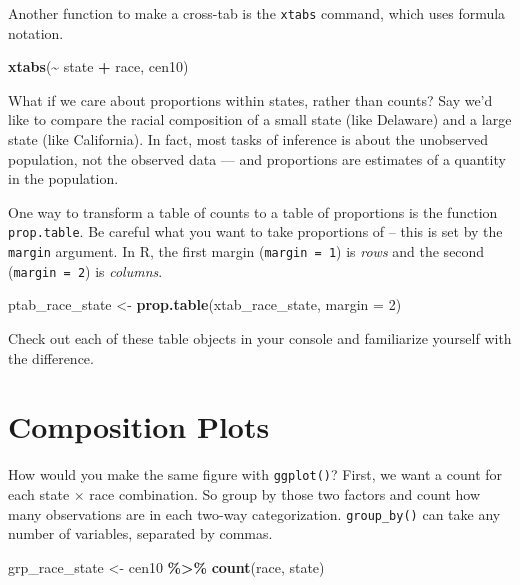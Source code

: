 \documentclass[
]{book}
\newenvironment{Shaded}{\begin{snugshade}}{\end{snugshade}}
\newcommand{\DataTypeTok}[1]{\textcolor[rgb]{0.13,0.29,0.53}{#1}}
\newcommand{\DecValTok}[1]{\textcolor[rgb]{0.00,0.00,0.81}{#1}}
\newcommand{\KeywordTok}[1]{\textcolor[rgb]{0.13,0.29,0.53}{\textbf{#1}}}
\newcommand{\NormalTok}[1]{#1}
\newcommand{\OperatorTok}[1]{\textcolor[rgb]{0.81,0.36,0.00}{\textbf{#1}}}
\newcommand{\StringTok}[1]{\textcolor[rgb]{0.31,0.60,0.02}{#1}}
\theoremstyle{definition}
\theoremstyle{definition}
\theoremstyle{definition}
\theoremstyle{remark}
\begin{document}
Another function to make a cross-tab is the \texttt{xtabs} command, which uses formula notation.

\begin{Shaded}
\begin{Highlighting}[]
\KeywordTok{xtabs}\NormalTok{(}\OperatorTok{\textasciitilde{}}\StringTok{ }\NormalTok{state }\OperatorTok{+}\StringTok{ }\NormalTok{race, cen10)}
\end{Highlighting}
\end{Shaded}

What if we care about proportions within states, rather than counts? Say we'd like to compare the racial composition of a small state (like Delaware) and a large state (like California). In fact, most tasks of inference is about the unobserved population, not the observed data --- and proportions are estimates of a quantity in the population.

One way to transform a table of counts to a table of proportions is the function \texttt{prop.table}. Be careful what you want to take proportions of -- this is set by the \texttt{margin} argument. In R, the first margin (\texttt{margin\ =\ 1}) is \emph{rows} and the second (\texttt{margin\ =\ 2}) is \emph{columns}.

\begin{Shaded}
\begin{Highlighting}[]
\NormalTok{ptab\_race\_state <{-}}\StringTok{ }\KeywordTok{prop.table}\NormalTok{(xtab\_race\_state, }\DataTypeTok{margin =} \DecValTok{2}\NormalTok{)}
\end{Highlighting}
\end{Shaded}

Check out each of these table objects in your console and familiarize yourself with the difference.

\hypertarget{composition-plots}{%
\section{Composition Plots}\label{composition-plots}}

How would you make the same figure with \texttt{ggplot()}? First, we want a count for each state \(\times\) race combination. So group by those two factors and count how many observations are in each two-way categorization. \texttt{group\_by()} can take any number of variables, separated by commas.

\begin{Shaded}
\begin{Highlighting}[]
\NormalTok{grp\_race\_state <{-}}\StringTok{ }\NormalTok{cen10 }\OperatorTok{\%>\%}\StringTok{ }
\StringTok{  }\KeywordTok{count}\NormalTok{(race, state)}
\end{Highlighting}
\end{Shaded}
\end{document}
